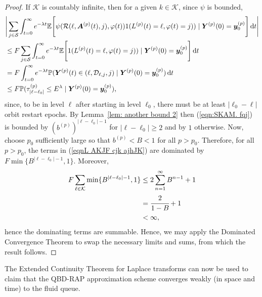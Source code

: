 \begin{proof}
	If \(\mathcal K\) is countably infinite, then for a given \(k\in\mathcal K\), since \(\psi\) is bounded,
	\begin{align}
		&\Bigg|\sum_{j\in\mathcal S}\int_{t=0}^\infty e^{-\lambda t}\mathbb E\Bigg[\psi( \mathcal R(\ell,\boldsymbol A^{(p)}(t),j),\varphi(t) )  1({L}^{(p)}(t)=\ell,\varphi(t)=j))  \mid \nonumber
		\boldsymbol Y^{(p)}(0)=\boldsymbol y_0^{(p)} \Bigg] \, \mathrm{d} t\Bigg| \nonumber 
		\\&\leq F \sum_{j\in\mathcal S}\int_{t=0}^\infty e^{-\lambda t}\mathbb E\Bigg[1({L}^{(p)}(t)=\ell,\varphi(t)=j))  \mid \nonumber
		\boldsymbol Y^{(p)}(0)=\boldsymbol y_0^{(p)}\Bigg] \, \mathrm{d} t \nonumber 
		\\&= F  \int_{t=0}^\infty e^{-\lambda t}\mathbb P( {\boldsymbol Y}^{(p)}(t)\in(\ell,\mathcal D_{\ell,j},j) \mid   
		\boldsymbol Y^{(p)}(0)=\boldsymbol y_0^{(p)})\, \mathrm{d} t \nonumber 
		\\&\leq F \mathbb P(\tau_{|\ell-\ell_0|}^{(p)}\leq E^\lambda \mid
			\boldsymbol Y^{(p)}(0)=\boldsymbol y_0^{(p)}), \label{eqn:SKAM. fqj}
	\end{align}
	since, to be in level \(\ell\) after starting in level \(\ell_0\), there must be at least \(|\ell_0-\ell|\) orbit restart epochs. By Lemma~\ref{lem: another bound 2} then (\ref{eqn:SKAM. fqj}) is bounded by \(\left(b^{(p)}\right)^{|\ell-\ell_0|-1}\) for \(|\ell-\ell_0|\geq 2\) and by \(1\) otherwise. Now, choose \(p_0\) sufficiently large so that \(b^{(p)}<B<1\) for all \(p>p_0\). Therefore, for all \(p>p_0\), the terms in (\ref{eqnL AKJF cjk ajhJK}) are dominated by \(F\min\{B^{|\ell-\ell_0|-1},1\}\). Moreover, 
	\begin{align*}
		F\sum_{\ell\in\mathcal K} \min\{B^{|\ell-\ell_0|-1},1\} 
		&\leq2\sum_{n=1}^\infty B^{n-1}+1
		\\&=\cfrac{2}{1-B}+1
		\\&<\infty,
	\end{align*}
	hence the dominating terms are summable. Hence, we may apply the Dominated Convergence Theorem to swap the necessary limits and sums, from which the result follows.
\end{proof} 

The Extended Continuity Theorem for Laplace transforms \cite[Chapter XIII, Theorem 2a]{feller1957} can now be used to claim that the QBD-RAP approximation scheme converges weakly (in space and time) to the fluid queue. 

